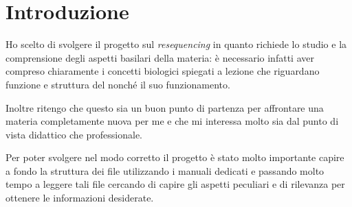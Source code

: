 \section{Introduzione}
Ho scelto di svolgere il progetto sul \emph{resequencing} in quanto richiede lo studio e la comprensione degli aspetti basilari della materia: è necessario infatti aver compreso chiaramente i concetti biologici spiegati a lezione che riguardano funzione e struttura del  nonché il suo funzionamento.

Inoltre ritengo che questo sia un buon punto di partenza per affrontare una materia completamente nuova per me e che mi interessa molto sia dal punto di vista didattico che professionale.

Per poter svolgere nel modo corretto il progetto è stato molto importante capire a fondo la struttura dei file  utilizzando i manuali dedicati e passando molto tempo a leggere tali file cercando di capire gli aspetti peculiari e di rilevanza per ottenere le informazioni desiderate.